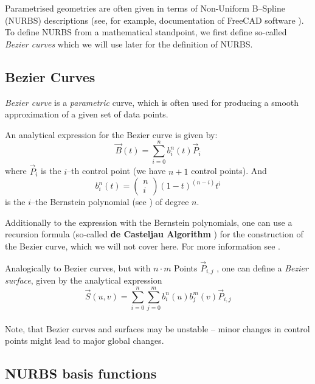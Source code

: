 Parametrised geometries are often given in terms of Non-Uniform B--Spline (NURBS) descriptions (see, for example, documentation of FreeCAD software \cite{FreeCAD}). 
To define NURBS from a mathematical standpoint, we first define so-called \textit{Bezier curves} \cite{farin2002handbook} which we will use later for the definition of NURBS.
\subsection{Bezier Curves}
\emph{Bezier curve} is a \textit{parametric} curve, which is often used for producing a smooth approximation of a given set of data points.
 
An analytical expression for the Bezier curve is given by:
\begin{equation*}
\vec{B}(t)=\sum\limits_{i=0}^n b_i^n(t) \vec{P}_i
\end{equation*}
where $\vec{P}_i$ is the $i$--th control point (we have $n+1$ control points). And
\begin{equation*}
b_i^n(t)=\left(\begin{array}{c}n\\i\end{array}\right)(1-t)^{(n-i)}t^i
\end{equation*}
is the $i$--the Bernstein polynomial (see \cite{lorentz2012bernstein}) of degree $n$.

Additionally to the expression with the Bernstein polynomials, one can use a recursion formula (so-called \textbf{de Casteljau Algorithm} \cite{farin2002handbook}) for the construction of the Bezier curve, which we will not cover here. For more information see \cite{farin2002handbook}.

Analogically to Bezier curves, but with $n\cdot m$ Points $\vec{P}_{i,j}$ ,
one can define a \textit{Bezier surface}, given by the analytical expression
\begin{equation*}
\vec{S}(u,v)=\sum\limits_{i=0}^n \sum\limits_{j=0}^m b_i^n(u) b_j^m(v) \vec{P}_{i,j}
\end{equation*}
\\
Note, that Bezier curves and surfaces may be unstable -- minor changes in control points might lead to major global changes.


\subsection{NURBS basis functions}

